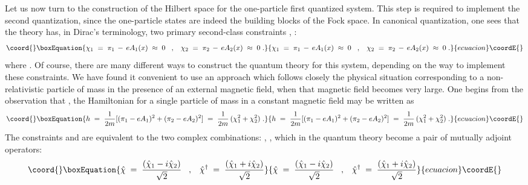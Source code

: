 \documentclass[a4paper,12pt]{article}
\begin{document}
Let us now turn to the construction of the Hilbert space for the
one-particle first quantized system. This step is required to
implement the second quantization, since the one-particle states
are
indeed the building blocks of the Fock space. In canonical
quantization, one sees that the theory has, in Dirac's terminology,
two primary second-class constraints \coordHE{}, \coordHE{}:
\begin{equation}\coord{}\boxEquation{
  \label{eq:defcs}
\chi_1 \;=\; \pi_1 \,-\, e A_1(x) \;\approx\; 0 \;\;\;,\;\;\;
\chi_2 \;=\; \pi_2 \,-\, e A_2(x) \;\approx\; 0 \;.
}{
  \chi_1 \;=\; \pi_1 \,-\, e A_1(x) \;\approx\; 0 \;\;\;,\;\;\;
\chi_2 \;=\; \pi_2 \,-\, e A_2(x) \;\approx\; 0 \;.
}{ecuacion}\coordE{}\end{equation}
where \coordHE{}. Of course, there are many different
ways to
construct the quantum theory for this system, depending on the way
to
implement these constraints.  We have found it convenient to use an
approach which follows closely the physical situation corresponding
to
a non-relativistic particle of mass \coordHE{} in the presence of an
external
magnetic field, when that magnetic field becomes very large. One
begins from the observation that \coordHE{}, the Hamiltonian for a single
particle of mass \coordHE{} in a constant magnetic field \coordHE{} may be
written
as
\begin{equation}\coord{}\boxEquation{
  \label{eq:cons1}
h\;=\; \frac{1}{2m} [(\pi_1 - e A_1)^2 + (\pi_2 - e A_2)^2 ]
\;=\; \frac{1}{2m} \, ( \chi_1^2 + \chi_2^2) \;.
}{
  h\;=\; \frac{1}{2m} [(\pi_1 - e A_1)^2 + (\pi_2 - e A_2)^2 ]
\;=\; \frac{1}{2m} \, ( \chi_1^2 + \chi_2^2) \;.
}{ecuacion}\coordE{}\end{equation}
The constraints \coordHE{} and \coordHE{} are equivalent to the two
complex
combinations: \coordHE{}, \coordHE{}, which in the quantum theory become a pair of
mutually
adjoint operators:
\begin{equation}\coord{}\boxEquation{
  \label{eq:const2}
 {\hat \chi}\;=\;\frac{({\hat \chi}_1 - i {\hat \chi}_2)}{\sqrt{2}}
\;\;\;,\;\;\;
 {\hat \chi}^\dagger \;=\;\frac{({\hat \chi}_1 + i {\hat
\chi}_2)}{\sqrt{2}}
}{
  {\hat \chi}\;=\;\frac{({\hat \chi}_1 - i {\hat \chi}_2)}{\sqrt{2}}
\;\;\;,\;\;\;
 {\hat \chi}^\dagger \;=\;\frac{({\hat \chi}_1 + i {\hat
\chi}_2)}{\sqrt{2}}
}{ecuacion}\coordE{}\end{equation}
\end{document}
